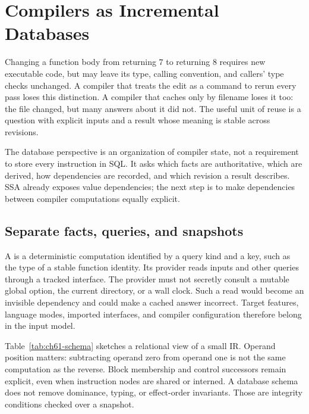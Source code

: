 \chapter{Compilers as Incremental Databases}
\label{ch:incremental-databases}

Changing a function body from returning $7$ to returning $8$ requires new executable code, but may leave its type, calling convention, and callers' type checks unchanged.
A compiler that treats the edit as a command to rerun every pass loses this distinction.
A compiler that caches only by filename loses it too: the file changed, but many answers about it did not.
The useful unit of reuse is a question with explicit inputs and a result whose meaning is stable across revisions.

The database perspective is an organization of compiler state, not a requirement to store every instruction in SQL.
It asks which facts are authoritative, which are derived, how dependencies are recorded, and which revision a result describes.
SSA already exposes value dependencies; the next step is to make dependencies between compiler computations equally explicit.

\section{Separate facts, queries, and snapshots}
\label{sec:ch61-schema}

A  is a deterministic computation identified by a query kind and a key, such as the type of a stable function identity.
Its provider reads inputs and other queries through a tracked interface.
The provider must not secretly consult a mutable global option, the current directory, or a wall clock.
Such a read would become an invisible dependency and could make a cached answer incorrect.
Target features, language modes, imported interfaces, and compiler configuration therefore belong in the input model.

Table~\ref{tab:ch61-schema} sketches a relational view of a small IR.
Operand position matters: subtracting operand zero from operand one is not the same computation as the reverse.
Block membership and control successors remain explicit, even when instruction nodes are shared or interned.
A database schema does not remove dominance, typing, or effect-order invariants.
Those are integrity conditions checked over a snapshot.

